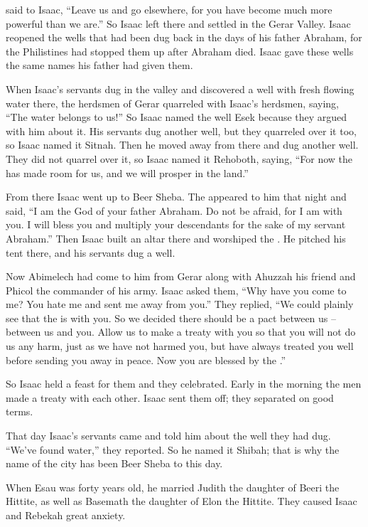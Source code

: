 {said
to
Isaac,
“Leave us and go
elsewhere, for
you have become much more powerful
than we are.”
So
Isaac
left
there
and settled
in
the Gerar
Valley.
Isaac
reopened
the wells
that had
been dug
back in the days
of his father
Abraham,
for the Philistines
had stopped
them up after
Abraham
died.
Isaac gave
these wells the same names
his father
had
given them.
\par }{\PP {}When Isaac’s
servants
dug
in the valley
and discovered
a well
with fresh flowing
water
there,
the herdsmen
of Gerar
quarreled
with
Isaac’s
herdsmen,
saying,
“The water
belongs to us!” So Isaac named
the well
Esek
because
they argued
with him about it.
His servants dug
another
well,
but they quarreled
over
it too,
so Isaac named
it Sitnah.
Then he moved
away from there
and dug
another
well.
They did not
quarrel
over
it, so
Isaac named
it Rehoboth,
saying,
“For
now
the {}
has made
room
for us, and we will prosper
in the land.”
\par }{\PP {}From there
Isaac went up
to Beer Sheba.
The
{}
appeared
to him
that night
and said,
“I am
the God
of your father
Abraham.
Do not
be afraid,
for
I am with
you. I
will bless
you and multiply
your descendants
for the sake of
my servant
Abraham.”
Then Isaac
built
an altar
there
and worshiped
the {}. He pitched
his tent
there,
and his servants
dug
a well.
\par }{\PP {}Now Abimelech
had come
to him
from Gerar
along with Ahuzzah
his friend
and Phicol
the commander
of his army.
Isaac
asked
them, “Why
have you come
to
me? You
hate
me and sent me away from you.”
They replied,
“We could plainly
see
that
the {}
is with
you. So we decided there should be
a pact
between us – between us and you. Allow us to make a treaty with you
so that you will not
do
us any harm,
just as we have not
harmed
you, but have always
treated
you well
before sending
you away
in peace.
Now
you
are blessed
by the
{}.”
\par }{\PP {}So Isaac held
a feast
for them and they celebrated.
Early
in the morning
the men made a treaty
with each
other.
Isaac
sent
them off; they separated
on good terms.
\par }{\PP {}That
day
Isaac’s
servants
came
and told
him about the well
they had
dug.
“We’ve found
water,”
they reported.
So
he named
it Shibah;
that is why
the name
of the city
has been Beer Sheba
to this
day.
\par }{\PP {}When
Esau
was forty
years
old, he married
Judith
the daughter
of Beeri
the Hittite,
as well as Basemath
the daughter
of Elon
the Hittite.
They caused
Isaac
and Rebekah
great anxiety.

}
